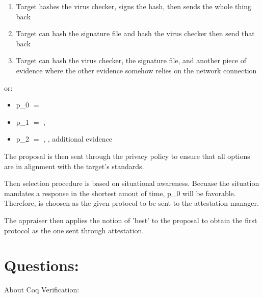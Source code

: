 \documentclass[10pt]{report}
\newcommand{\squash}{\itemsep=0pt\parskip=0pt}
\begin{document}
\begin{enumerate}
  \squash
\item Target hashes the virus checker, signs the hash, then sends the
  whole thing back
\item Target can hash the signature file and hash the virus checker
  then send that back
\item Target can hash the virus checker, the signature file, and another
  piece of evidence where the other evidence somehow relies on the network
  connection
\end{enumerate}

or: 

\begin{itemize}
  \squash
\item p_0 $=$  
\item p_1 $=$  {, }
\item p_2 $=$  {, }, additional
  evidence
\end{itemize}


The proposal is then sent through the privacy policy to ensure that
all options are in alignment with the target's standards.

Then selection procedure is based on situational awareness. Becuase the
situation mandates a response in the shortest amout of time, p_0 will be
favorable. Therefore,  is choosen as the
given protocol to be sent to the attestation manager.

The appraiser then applies the notion of 'best' to the proposal to obtain
the first protocol as the one sent through attestation.

\chapter{Questions:}

About Coq Verification:
\end{document}
